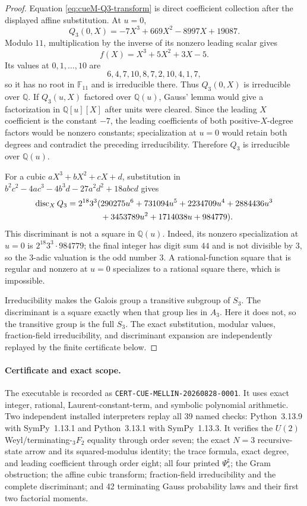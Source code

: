 \begin{proof}
Equation \eqref{eq:cueM-Q3-transform} is direct coefficient collection after the displayed
affine substitution.  At $u=0$,
\[
 Q_3(0,X)=-7X^3+669X^2-8997X+19087.
\]
Modulo $11$, multiplication by the inverse of its nonzero leading scalar gives
\[
 f(X)=X^3+5X^2+3X-5.
\]
Its values at $0,1,\ldots,10$ are
\[
 6,4,7,10,8,7,2,10,4,1,7,
\]
so it has no root in $\mathbb F_{11}$ and is irreducible there.  Thus
$Q_3(0,X)$ is irreducible over $\mathbb Q$.  If $Q_3(u,X)$ factored over
$\mathbb Q(u)$, Gauss' lemma would give a factorization in $\mathbb Q[u][X]$ after units
were cleared.  Since the leading $X$ coefficient is the constant $-7$, the leading
coefficients of both positive-$X$-degree factors would be nonzero constants; specialization
at $u=0$ would retain both degrees and contradict the preceding irreducibility.  Therefore
$Q_3$ is irreducible over $\mathbb Q(u)$.

For a cubic $aX^3+bX^2+cX+d$, substitution in
$b^2c^2-4ac^3-4b^3d-27a^2d^2+18abcd$ gives
\begin{align}
 \operatorname{disc}_XQ_3
 =2^{18}3^3(&290275u^6+731094u^5+2234709u^4+2884436u^3\notag\\
             &+3453789u^2+1714038u+984779).
 \label{eq:cueM-Q3-discriminant}
\end{align}
This discriminant is not a square in $\mathbb Q(u)$.  Indeed, its nonzero specialization at
$u=0$ is $2^{18}3^3\cdot984779$; the final integer has digit sum $44$ and is not divisible
by $3$, so the $3$-adic valuation is the odd number $3$.  A rational-function square that is
regular and nonzero at $u=0$ specializes to a rational square there, which is impossible.

Irreducibility makes the Galois group a transitive subgroup of $S_3$.  The discriminant is a
square exactly when that group lies in $A_3$.  Here it does not, so the transitive group is
the full $S_3$.  The exact substitution, modular values, fraction-field irreducibility, and
discriminant expansion are independently replayed by the finite certificate below.
\end{proof}

\paragraph{Certificate and exact scope.}
The executable
is recorded as \texttt{CERT-CUE-MELLIN-20260828-0001}.  It uses exact integer, rational,
Laurent-constant-term, and symbolic polynomial arithmetic.  Two independent installed
interpreters replay all 39 named checks: Python~3.13.9 with SymPy~1.13.1 and Python~3.13.1
with SymPy~1.13.3.  It verifies the $U(2)$ Weyl/terminating-${}_3F_2$ equality through order
seven; the exact $N=3$ recursive-state arrow and its squared-modulus identity; the trace
formula, exact degree, and leading coefficient through order eight; all four printed
$\Psi_s^\sharp$; the Gram obstruction; the affine cubic transform; fraction-field
irreducibility and the complete discriminant; and 42 terminating Gauss probability laws and
their first two factorial moments.

